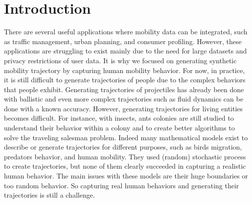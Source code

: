 \documentclass[a4]{article}
\begin{document}
\section{Introduction}
There are several useful applications where mobility data can be integrated, such as traffic management, urban planning, and consumer profiling. However, these applications are struggling to exist mainly due to the need for large datasets and privacy restrictions of user data. It is why we focused on generating synthetic mobility trajectory by capturing human mobility behavior. For now, in practice, it is still difficult to generate trajectories of people due to the complex behaviors that people exhibit. Generating trajectories of projectiles has already been done with ballistic and even more complex trajectories such as fluid dynamics can be done with a known accuracy. However, generating trajectories for living entities becomes difficult. For instance, with insects, ants colonies are still studied to understand their behavior within a colony and to create better algorithms to solve the traveling salesman problem. Indeed many mathematical models exist to describe or generate trajectories for different purposes, such as birds migration, predators behavior, and human mobility. They used (random) stochastic process to create trajectories, but none of them clearly succeeded in capturing a realistic human behavior. The main issues with these models are their huge boundaries or too random behavior. So capturing real human behaviors and generating their trajectories is still a challenge.
\end{document}
